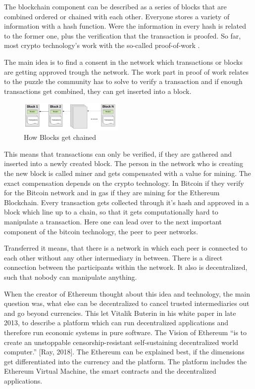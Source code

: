 The blockchain component can be described as a series of blocks that are combined ordered or chained with each other. 
Everyone stores a variety of information with a hash function.
Were the information in every hash is related to the former one, plus the verification that the transaction is proofed. 
So far, most crypto technology’s work with the so-called proof-of-work \cite{Ray2018}.

The main idea is to find a consent in the network which transactions or blocks are getting approved trough the network. The work part in proof of work relates to the puzzle the community has to solve to verify a transaction and if enough transactions get combined, they can get inserted into a block.

\begin{figure}[ht]
\centering
\caption{How Blocks get chained} 
\includegraphics[width=0.45\textwidth]{blockchain}
\end{figure}

This means that transactions can only be verified, if they are gathered and inserted into a newly created block. The person in the network who is creating the new block is called miner and gets compensated with a value for mining. 
The exact compensation depends on the crypto technology. 
In Bitcoin if they verify for the Bitcoin network and in gas if they are mining for the Ethereum Blockchain. 
Every transaction gets collected through it's hash and approved in a block which line up to a chain, so that it gets computationally hard to manipulate a transaction. 
Here one can lead over to the next important component of the bitcoin technology, the peer to peer networks. 

Transferred it means, that there is a network in which each peer is connected to each other without any other intermediary in between.
There is a direct connection between the participants within the network. 
It also is decentralized, such that nobody can manipulate anything.

When the creator of Ethereum thought about this idea and technology, the main question was, what else can be decentralized to cancel trusted intermediaries out and go beyond currencies.
This let Vitalik Buterin in his white paper in late 2013, to describe a platform which can run decentralized applications and therefore run economic systems in pure software. 
The Vision of Ethereum “is to create an unstoppable censorship-resistant self-sustaining decentralized world computer.” [Ray, 2018].
The Ethereum can be explained best, if the dimensions get differentiated into the currency and the platform. 
The platform includes the Ethereum Virtual Machine, the smart contracts and the decentralized applications. 

